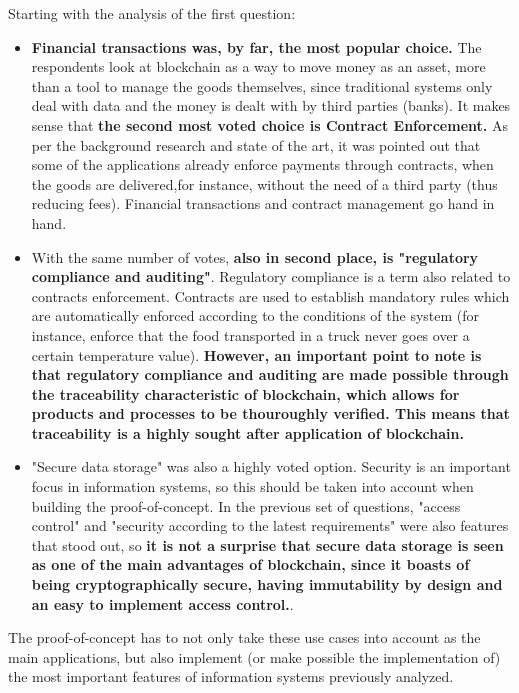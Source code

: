 Starting with the analysis of the first question:
\begin{itemize}
    \item \textbf{Financial transactions was, by far, the most popular choice.} The respondents look at blockchain as a way to move money as an asset, more than a tool to manage the goods themselves, since traditional systems only deal with data and the money is dealt with by third parties (banks). It makes sense that \textbf{the second most voted choice is Contract Enforcement.} As per the background research and state of the art, it was pointed out that some of the applications already enforce payments through contracts, when the goods are delivered,for instance, without the need of a third party (thus reducing fees). Financial transactions and contract management go hand in hand. 
     
    \item With the same number of votes, \textbf{also in second place, is "regulatory compliance and auditing"}. Regulatory compliance is a term also related to contracts enforcement. Contracts are used to establish mandatory rules which are automatically enforced according to the conditions of the system (for instance, enforce that the food transported in a truck never goes over a certain temperature value). \textbf{However, an important point to note is that regulatory compliance and auditing are made possible through the traceability characteristic of blockchain, which allows for products and processes to be thouroughly verified. This means that traceability is a highly sought after application of blockchain.}
    \item "Secure data storage" was also a highly voted option. Security is an important focus in information systems, so this should be taken into account when building the proof-of-concept. In the previous set of questions, "access control" and "security according to the latest requirements" were also features that stood out, so \textbf{it is not a surprise that secure data storage is seen as one of the main advantages of blockchain, since it boasts of being cryptographically secure, having immutability by design and an easy to implement access control.}. 

\end{itemize}

The proof-of-concept has to not only take these use cases into account as the main applications, but also implement (or make possible the implementation of) the most important features of information systems previously analyzed.

